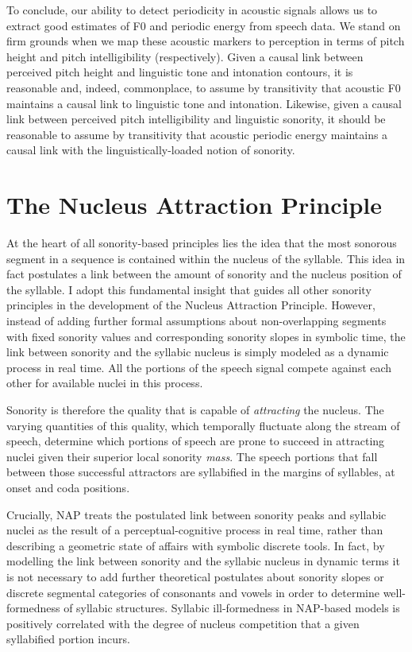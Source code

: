 To conclude, our ability to detect periodicity in acoustic signals allows us to extract good estimates of F0 and periodic energy from speech data. We stand on firm grounds when we map these acoustic markers to perception in terms of pitch height and pitch intelligibility (respectively).
Given a causal link between perceived pitch height and linguistic tone and intonation contours, it is reasonable and, indeed, commonplace, to assume by transitivity that acoustic F0 maintains a causal link to linguistic tone and intonation.
Likewise, given a causal link between perceived pitch intelligibility and linguistic sonority, it should be reasonable to assume by transitivity that acoustic periodic energy maintains a causal link with the linguistically-loaded notion of sonority.

\section{The Nucleus Attraction Principle}\label{sec:nap}

At the heart of all sonority-based principles lies the idea that the most sonorous segment in a sequence is contained within the nucleus of the syllable. This idea in fact postulates a link between the amount of sonority and the nucleus position of the syllable. I adopt this fundamental insight that guides all other sonority principles in the development of the Nucleus Attraction Principle. However, instead of adding further formal assumptions about non-overlapping segments with fixed sonority values and corresponding sonority slopes in symbolic time, the link between sonority and the syllabic nucleus is simply modeled as a dynamic process in real time. All the portions of the speech signal compete against each other for available nuclei in this process.

Sonority is therefore the quality that is capable of \emph{attracting} the nucleus. The varying quantities of this quality, which temporally fluctuate along the stream of speech, determine which portions of speech are prone to succeed in attracting nuclei given their superior local sonority \emph{mass}. The speech portions that fall between those successful attractors are syllabified in the margins of syllables, at onset and coda positions.

Crucially, NAP treats the postulated link between sonority peaks and syllabic nuclei as the result of a perceptual-cognitive process in real time, rather than describing a geometric state of affairs with symbolic discrete tools.
In fact, by modelling the link between sonority and the syllabic nucleus in dynamic terms it is not necessary to add further theoretical postulates about sonority slopes or discrete segmental categories of consonants and vowels in order to determine well-formedness of syllabic structures. Syllabic ill-formedness in NAP-based models is positively correlated with the degree of nucleus competition that a given syllabified portion incurs.

